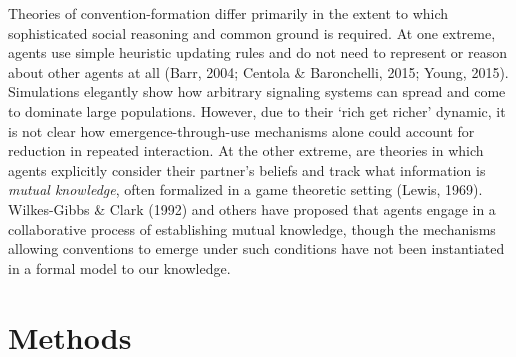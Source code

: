 Theories of convention-formation differ primarily in the extent to which
sophisticated social reasoning and common ground is required. At one
extreme, agents use simple heuristic updating rules and do not need to
represent or reason about other agents at all (Barr, 2004; Centola \&
Baronchelli, 2015; Young, 2015). Simulations elegantly show how
arbitrary signaling systems can spread and come to dominate large
populations. However, due to their `rich get richer' dynamic, it is not
clear how emergence-through-use mechanisms alone could account for
reduction in repeated interaction. At the other extreme, are theories in
which agents explicitly consider their partner's beliefs and track what
information is \emph{mutual knowledge}, often formalized in a game
theoretic setting (Lewis, 1969). Wilkes-Gibbs \& Clark (1992) and others
have proposed that agents engage in a collaborative process of
establishing mutual knowledge, though the mechanisms allowing
conventions to emerge under such conditions have not been instantiated
in a formal model to our knowledge.



\section{Methods}

